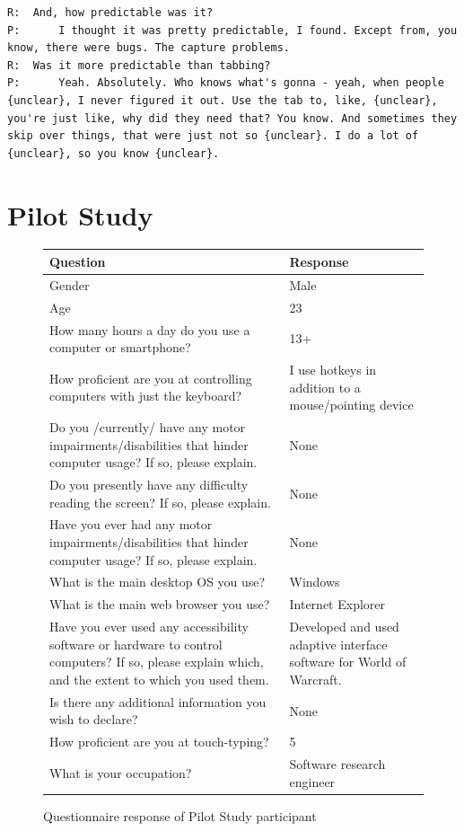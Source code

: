\documentclass[11pt,openright,a4paper]{report}
\begin{document}
\begin{lstlisting}[caption={Transcript of Usability Study}, label={lst:usabilityTrans}, style=basic, language=custom, flexiblecolumns=true]
R:	And, how predictable was it?
P:		I thought it was pretty predictable, I found. Except from, you know, there were bugs. The capture problems.
R:	Was it more predictable than tabbing?
P:		Yeah. Absolutely. Who knows what's gonna - yeah, when people {unclear}, I never figured it out. Use the tab to, like, {unclear}, you're just like, why did they need that? You know. And sometimes they skip over things, that were just not so {unclear}. I do a lot of {unclear}, so you know {unclear}.
\end{lstlisting}
\FloatBarrier


\chapter{Pilot Study}

\begin{figure}[ht]
\renewcommand{\arraystretch}{1.5}

\begin{tabularx}{\textwidth}{X|X}
\hline\hline %
Question & Response \\ [0.5ex] %
\hline
Gender	&	Male	\\
Age	&	23	\\
How many hours a day do you use a computer or smartphone?	&	13+	\\
How proficient are you at controlling computers with just the keyboard?	&	I use hotkeys in addition to a mouse/pointing device	\\
Do you /currently/ have any motor impairments/disabilities that hinder computer usage? If so, please explain.	&	None	\\
Do you presently have any difficulty reading the screen? If so, please explain.	&	None	\\
Have you ever had any motor impairments/disabilities that hinder computer usage? If so, please explain.	&	None	\\
What is the main desktop OS you use?	&	Windows	\\
What is the main web browser you use?	&	Internet Explorer	\\
Have you ever used any accessibility software or hardware to control computers? If so, please explain which, and the extent to which you used them.	&	Developed and used adaptive interface software for World of Warcraft.	\\
Is there any additional information you wish to declare?	&	None	\\
How proficient are you at touch-typing?	&	5	\\
What is your occupation?	&	Software research engineer	\\ [1ex] %
\hline %
\end{tabularx}
\caption{Questionnaire response of Pilot Study participant}
\label{fig:partic_pilotpre}
\end{figure}
\end{document}
